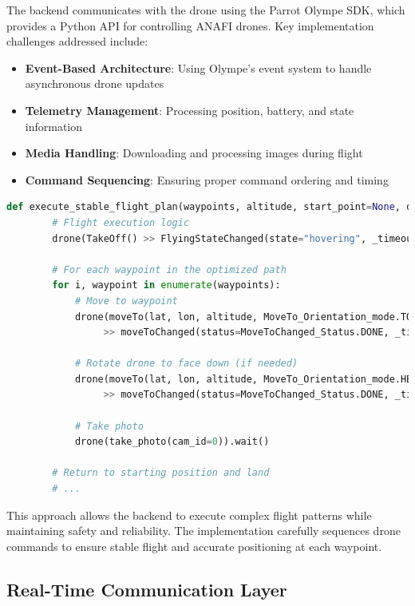     The backend communicates with the drone using the Parrot Olympe SDK, which provides a Python API for controlling ANAFI drones. Key implementation challenges addressed include:
    
    \begin{itemize}
        \item \textbf{Event-Based Architecture}: Using Olympe's event system to handle asynchronous drone updates
        \item \textbf{Telemetry Management}: Processing position, battery, and state information
        \item \textbf{Media Handling}: Downloading and processing images during flight
        \item \textbf{Command Sequencing}: Ensuring proper command ordering and timing
    \end{itemize}
    
    \begin{lstlisting}[language=Python]
    def execute_stable_flight_plan(waypoints, altitude, start_point=None, drone_start_point=None):
        # Flight execution logic
        drone(TakeOff() >> FlyingStateChanged(state="hovering", _timeout=10)).wait().success()
        
        # For each waypoint in the optimized path
        for i, waypoint in enumerate(waypoints):
            # Move to waypoint
            drone(moveTo(lat, lon, altitude, MoveTo_Orientation_mode.TO_TARGET, 0.0)
                 >> moveToChanged(status=MoveToChanged_Status.DONE, _timeout=30)).wait().success()
            
            # Rotate drone to face down (if needed)
            drone(moveTo(lat, lon, altitude, MoveTo_Orientation_mode.HEADING_START, rotation)
                 >> moveToChanged(status=MoveToChanged_Status.DONE, _timeout=10)).wait().success()
            
            # Take photo
            drone(take_photo(cam_id=0)).wait()
        
        # Return to starting position and land
        # ...
    \end{lstlisting}
    
    This approach allows the backend to execute complex flight patterns while maintaining safety and reliability. The implementation carefully sequences drone commands to ensure stable flight and accurate positioning at each waypoint.
    
    \subsection{Real-Time Communication Layer}
    
